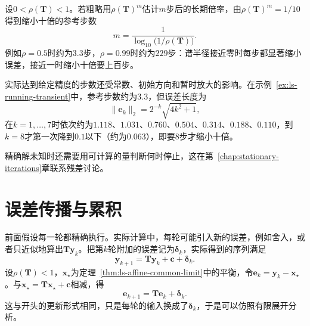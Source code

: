 设$0<\rho(\bm T)<1$。若粗略用$\rho(\bm T)^m$估计$m$步后的长期倍率，由$\rho(\bm T)^m=1/10$得到缩小十倍的参考步数
\[
 m=\frac{1}{\log_{10}\bigl(1/\rho(\bm T)\bigr)} .
\]
例如$\rho=0.5$时约为$3.3$步，$\rho=0.99$时约为$229$步：谱半径接近零时每步都显著缩小误差，接近一时缩小十倍要上百步。

实际达到给定精度的步数还受常数、初始方向和暂时放大的影响。在示例~\ref{ex:ls-running-transient}中，参考步数约为$3.3$，但误差长度为
\[
 \lVert\bm e_k\rVert_2=2^{-k}\sqrt{4k^2+1} ,
\]
在$k=1,\ldots,7$时依次约为$1.118$、$1.031$、$0.760$、$0.504$、$0.314$、$0.188$、$0.110$，到$k=8$才第一次降到$0.1$以下（约为$0.063$），即要$8$步才缩小十倍。

精确解未知时还需要用可计算的量判断何时停止，这在第~\ref{chap:stationary-iterations}章联系残差讨论。

\section{误差传播与累积}
\label{sec:ls-accumulated-step-errors}

前面假设每一轮都精确执行。实际计算中，每轮可能引入新的误差，例如舍入，或者只近似地算出$\bm T\bm y_k$。把第$k$轮附加的误差记为$\bm\delta_k$，实际得到的序列满足
\[
 \bm y_{k+1}=\bm T\bm y_k+\bm c+\bm\delta_k .
\]
设$\rho(\bm T)<1$，$\bm x_\star$为定理~\ref{thm:ls-affine-common-limit}中的平衡，令$\bm e_k=\bm y_k-\bm x_\star$。与$\bm x_\star=\bm T\bm x_\star+\bm c$相减，得
\[
 \bm e_{k+1}=\bm T\bm e_k+\bm\delta_k .
\]
这与开头的更新形式相同，只是每轮的输入换成了$\bm\delta_k$，于是可以仿照有限展开分析。

